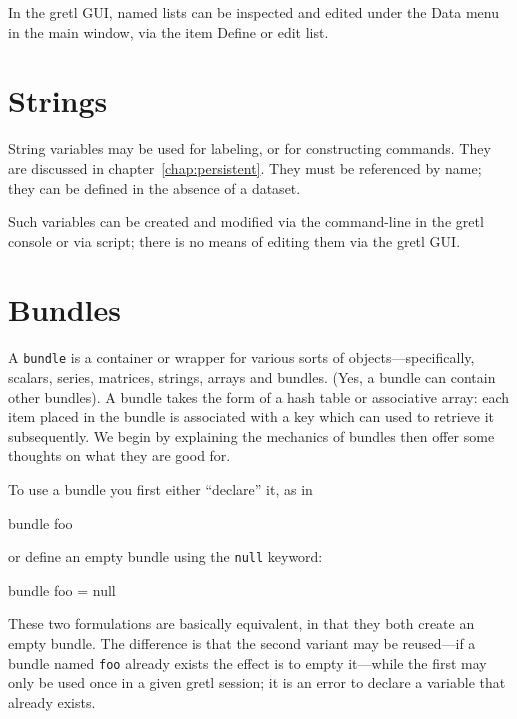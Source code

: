 In the gretl GUI, named lists can be inspected and edited under the
\textsf{Data} menu in the main window, via the item \textsf{Define or
  edit list}.

\section{Strings}
\label{sec:Strings}

String variables may be used for labeling, or for constructing
commands. They are discussed in chapter~\ref{chap:persistent}. They
must be referenced by name; they can be defined in the absence of a
dataset.

Such variables can be created and modified via the command-line in
the gretl console or via script; there is no means of editing them
via the gretl GUI.


\section{Bundles}
\label{sec:Bundles}

A \texttt{bundle} is a container or wrapper for various sorts of
objects---specifically, scalars, series, matrices, strings, arrays and
bundles. (Yes, a bundle can contain other bundles). A bundle takes the
form of a hash table or associative array: each item placed in the
bundle is associated with a key which can used to retrieve it
subsequently. We begin by explaining the mechanics of bundles then
offer some thoughts on what they are good for.

To use a bundle you first either ``declare'' it, as in
%
\begin{code}
bundle foo
\end{code}
%
or define an empty bundle using the \texttt{null} keyword:
%
\begin{code}
bundle foo = null
\end{code}
%
These two formulations are basically equivalent, in that they both
create an empty bundle. The difference is that the second variant may
be reused---if a bundle named \texttt{foo} already exists the effect
is to empty it---while the first may only be used once in a given
gretl session; it is an error to declare a variable that already
exists.

